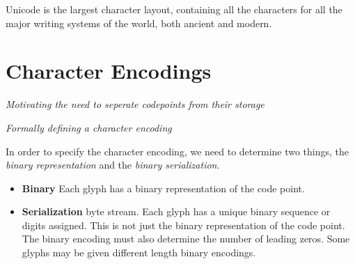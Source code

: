 \frmrule


\begin{example}
Unicode is the largest character layout, containing all the characters for 
all the major writing systems of the world, both ancient 
and modern. 
\end{example}

\frmrule





\frmrule


\section{Character Encodings}


\frmrule 

\textit{Motivating the need to seperate codepoints from their storage}



\frmrule 

\textit{Formally defining a character encoding}


In order to specify the character encoding, we need to determine two things, 
the \textit{binary representation} and the \textit{binary serialization}. 

\begin{itemize}   
\renewcommand{\labelitemi}{$\Box$} 
\item \textbf{Binary} Each glyph has a binary representation of the 
code point.  
\item \textbf{Serialization} byte stream. 
Each glyph has a unique binary sequence or digits 
assigned. This is not just the binary representation of the code point. 
The binary encoding must also determine the number of leading zeros.
Some glyphs may be given different length binary encodings. 
\end{itemize}



